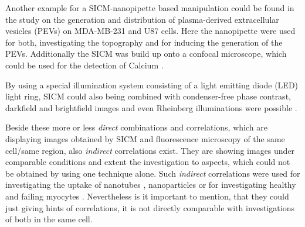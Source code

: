 Another example for a SICM-nanopipette based manipulation could be found in the study on the 
generation and distribution of plasma-derived extracellular vesicles (PEVs) on MDA-MB-231 and U87 
cells. Here the nanopipette were used for both, investigating the topography and for inducing the 
generation of the PEVs. Additionally the SICM was build up onto a confocal microscope, which could 
be used for the detection of Calcium \cite{Wang2020}.


By using a special illumination system consisting of a light emitting diode (LED) light ring, SICM 
could also being combined with condenser-free phase contrast, darkfield and brightfield images and 
even Rheinberg illuminations were possible \cite{Webb2014}.


Beside these more or less \emph{direct} combinations and correlations, which are displaying images 
obtained by SICM and fluorescence microscopy of the same cell/same region, also \emph{indirect} 
correlations exist. They are showing images under comparable conditions and extent the 
investigation to aspects, which could not be obtained by using one technique alone. Such 
\emph{indirect} correlations were used for investigating the uptake of nanotubes \cite{Lee2013}, 
nanoparticles \cite{Gesper2017} or for investigating healthy and failing myocytes \cite{Lyon2009}. 
Nevertheless is it important to mention, that they could just giving hints of correlations, it 
is not directly comparable with investigations of both in the same cell. 

